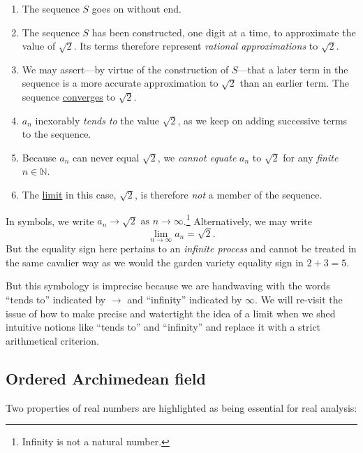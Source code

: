 \documentclass[
  a4paper,
]{article}
\begin{document}
\begin{enumerate}
\item
  The sequence \(S\) goes on without end.
\item
  The sequence \(S\) has been constructed, one digit at a time, to
  approximate the value of \(\sqrt{2}\). Its terms therefore represent
  \emph{rational approximations} to \(\sqrt{2}\).
\item
  We may assert---by virtue of the construction of \(S\)---that a later
  term in the sequence is a more accurate approximation to \(\sqrt{2}\)
  than an earlier term. The sequence
  \href{https://en.wikipedia.org/wiki/Convergent_series}{converges} to
  \(\sqrt{2}\).
\item
  \(a_{n}\) inexorably \emph{tends to} the value \(\sqrt{2}\), as we
  keep on adding successive terms to the sequence.
\item
  Because \(a_{n}\) can never equal \(\sqrt{2}\), we \emph{cannot
  equate} \(a_{n}\) to \(\sqrt{2}\) for any \emph{finite}
  \(n \in \mathbb{N}\).
\item
  The \href{https://en.wikipedia.org/wiki/Limit_(mathematics)}{limit} in
  this case, \(\sqrt{2}\), is therefore \emph{not} a member of the
  sequence.
\end{enumerate}

In symbols, we write
\(a_{n} \to \sqrt{2} \text{ as } n \to \infty\).\footnote{Infinity is
  not a natural number.} Alternatively, we may write \[
\lim_{n \to \infty}a_{n} = \sqrt{2}.
\] But the equality sign here pertains to an \emph{infinite process} and
cannot be treated in the same cavalier way as we would the garden
variety equality sign in \(2 + 3 = 5\).

But this symbology is imprecise because we are handwaving with the words
``tends to'' indicated by \(\to\) and ``infinity'' indicated by
\(\infty\). We will re-visit the issue of how to make precise and
watertight the idea of a limit when we shed intuitive notions like
``tends to'' and ``infinity'' and replace it with a strict arithmetical
criterion.

\subsection{Ordered Archimedean field}\label{ordered-archimedean-field}

Two properties of real numbers are highlighted as being essential for
real analysis:
\end{document}
